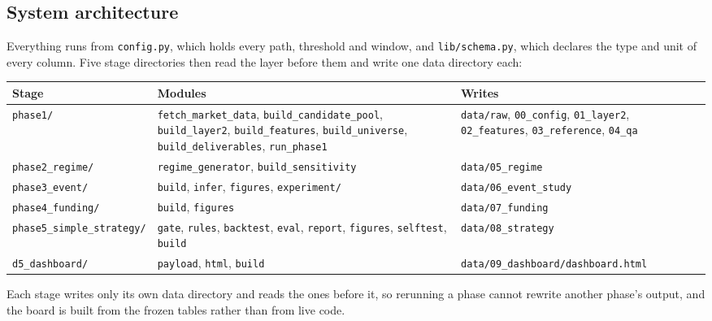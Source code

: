 \documentclass[11pt,a4paper]{article}
\begin{document}
\subsection{System architecture}

Everything runs from \texttt{config.py}, which holds every path, threshold and window, and \texttt{lib/\allowbreak{}schema.py}, which declares the type and unit of every column. Five stage directories then read the layer before them and write one data directory each:

\begin{table}[H]\centering
\footnotesize
\begin{tabularx}{\linewidth}{>{\raggedright\arraybackslash}X>{\raggedright\arraybackslash}X>{\raggedright\arraybackslash}X}
\toprule
Stage & Modules & Writes \\
\midrule
\texttt{phase1/\allowbreak{}} & \texttt{fetch\_market\_data}, \texttt{build\_candidate\_pool}, \texttt{build\_layer2}, \texttt{build\_features}, \texttt{build\_universe}, \texttt{build\_deliverables}, \texttt{run\_phase1} & \texttt{data/\allowbreak{}raw}, \texttt{00\_config}, \texttt{01\_layer2}, \texttt{02\_features}, \texttt{03\_reference}, \texttt{04\_qa} \\
\texttt{phase2\_regime/\allowbreak{}} & \texttt{regime\_generator}, \texttt{build\_sensitivity} & \texttt{data/\allowbreak{}05\_regime} \\
\texttt{phase3\_event/\allowbreak{}} & \texttt{build}, \texttt{infer}, \texttt{figures}, \texttt{experiment/\allowbreak{}} & \texttt{data/\allowbreak{}06\_event\_study} \\
\texttt{phase4\_funding/\allowbreak{}} & \texttt{build}, \texttt{figures} & \texttt{data/\allowbreak{}07\_funding} \\
\texttt{phase5\_simple\_strategy/\allowbreak{}} & \texttt{gate}, \texttt{rules}, \texttt{backtest}, \texttt{eval}, \texttt{report}, \texttt{figures}, \texttt{selftest}, \texttt{build} & \texttt{data/\allowbreak{}08\_strategy} \\
\texttt{d5\_dashboard/\allowbreak{}} & \texttt{payload}, \texttt{html}, \texttt{build} & \texttt{data/\allowbreak{}09\_dashboard/\allowbreak{}dashboard.html} \\
\bottomrule
\end{tabularx}
\end{table}

Each stage writes only its own data directory and reads the ones before it, so rerunning a phase cannot rewrite another phase's output, and the board is built from the frozen tables rather than from live code.
\end{document}
